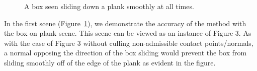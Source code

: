 \documentclass[9pt,twocolumn]{article}
\begin{document}
\setlength\fboxsep{0pt}
\setlength\fboxrule{0.5pt}
\begin{figure}[t]
\centering
{}
\caption{A box seen sliding down a plank smoothly at all times. }
\label{boxPlank}
\end{figure}

In the first scene (Figure~\ref{boxPlank}), we demonstrate the accuracy of the method with the box on plank scene. This scene can be viewed as an instance of Figure 3. As with the case of Figure 3 without culling non-admissible contact points/normals, a normal opposing the direction of the box sliding would prevent the box from sliding smoothly off of the edge of the plank as evident in the figure. \newline
\end{document}
